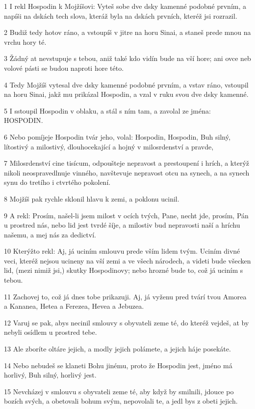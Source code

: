 \par 1 I rekl Hospodin k Mojžíšovi: Vyteš sobe dve dsky kamenné podobné prvním, a napíši na dskách tech slova, kteráž byla na dskách prvních, kteréž jsi rozrazil.
\par 2 Budiž tedy hotov ráno, a vstoupíš v jitre na horu Sinai, a staneš prede mnou na vrchu hory té.
\par 3 Žádný at nevstupuje s tebou, aniž také kdo vidín bude na vší hore; ani ovce neb volové pásti se budou naproti hore této.
\par 4 Tedy Mojžíš vytesal dve dsky kamenné podobné prvním, a vstav ráno, vstoupil na horu Sinai, jakž mu prikázal Hospodin, a vzal v ruku svou dve dsky kamenné.
\par 5 I sstoupil Hospodin v oblaku, a stál s ním tam, a zavolal ze jména: HOSPODIN.
\par 6 Nebo pomíjeje Hospodin tvár jeho, volal: Hospodin, Hospodin, Buh silný, lítostivý a milostivý, dlouhocekající a hojný v milosrdenství a pravde,
\par 7 Milosrdenství cine tisícum, odpoušteje nepravost a prestoupení i hrích, a kterýž nikoli neospravedlnuje vinného, navštevuje nepravost otcu na synech, a na synech synu do tretího i ctvrtého pokolení.
\par 8 Mojžíš pak rychle sklonil hlavu k zemi, a poklonu ucinil.
\par 9 A rekl: Prosím, našel-li jsem milost v ocích tvých, Pane, necht jde, prosím, Pán u prostred nás, nebo lid jest tvrdé šíje, a milostiv bud nepravosti naší a hríchu našemu, a mej nás za dedictví.
\par 10 Kterýžto rekl: Aj, já uciním smlouvu prede vším lidem tvým. Uciním divné veci, kteréž nejsou ucineny na vší zemi a ve všech národech, a videti bude všecken lid, (mezi nimiž jsi,) skutky Hospodinovy; nebo hrozné bude to, což já uciním s tebou.
\par 11 Zachovej to, což já dnes tobe prikazuji. Aj, já vyženu pred tvárí tvou Amorea a Kananea, Hetea a Ferezea, Hevea a Jebuzea.
\par 12 Varuj se pak, abys necinil smlouvy s obyvateli zeme té, do kteréž vejdeš, at by nebyli osídlem u prostred tebe.
\par 13 Ale zboríte oltáre jejich, a modly jejich polámete, a jejich háje posekáte.
\par 14 Nebo nebudeš se klaneti Bohu jinému, proto že Hospodin jest, jméno má horlivý, Buh silný, horlivý jest.
\par 15 Nevcházej v smlouvu s obyvateli zeme té, aby když by smilnili, jdouce po bozích svých, a obetovali bohum svým, nepovolali te, a jedl bys z obeti jejich.

